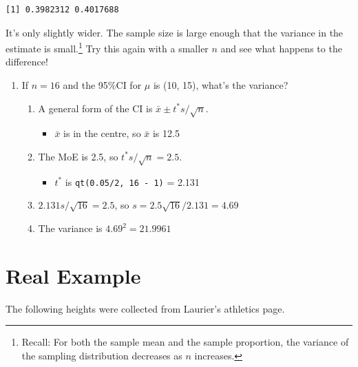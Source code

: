 \documentclass[
  letterpaper,
  DIV=11,
  numbers=noendperiod,
  oneside]{scrreprt}
\providecommand{\tightlist}{%
  \setlength{\itemsep}{0pt}\setlength{\parskip}{0pt}}\usepackage{longtable,booktabs,array}
\begin{document}
\begin{verbatim}
[1] 0.3982312 0.4017688
\end{verbatim}

It's only slightly wider. The sample size is large enough that the
variance in the estimate is small.\footnote{Recall: For both the sample
  mean and the sample proportion, the variance of the sampling
  distribution decreases as \(n\) increases.} Try this again with a
smaller \(n\) and see what happens to the difference!

\begin{enumerate}
\def\labelenumi{\arabic{enumi}.}
\setcounter{enumi}{2}
\tightlist
\item
  If \(n=16\) and the 95\%CI for \(\mu\) is (10, 15), what's the
  variance?

  \begin{enumerate}
  \def\labelenumii{\arabic{enumii}.}
  \tightlist
  \item
    A general form of the CI is \(\bar x \pm t^* s/\sqrt{n}\).

    \begin{itemize}
    \tightlist
    \item
      \(\bar x\) is in the centre, so \(\bar x\) is 12.5
    \end{itemize}
  \item
    The MoE is 2.5, so \(t^* s/\sqrt{n} = 2.5\).

    \begin{itemize}
    \tightlist
    \item
      \(t^*\) is \texttt{qt(0.05/2,\ 16\ -\ 1)} = 2.131
    \end{itemize}
  \item
    \(2.131s/\sqrt{16} = 2.5\), so \(s = 2.5\sqrt{16}/2.131 = 4.69\)
  \item
    The variance is \(4.69^2 = 21.9961\)
  \end{enumerate}
\end{enumerate}

\hypertarget{real-example}{%
\section{Real Example}\label{real-example}}

The following heights were collected from Laurier's athletics page.
\end{document}
